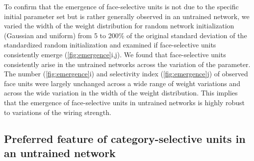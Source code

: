 \documentclass[sn-mathphys-num]{sn-jnl}%
\theoremstyle{thmstyleone}%
\theoremstyle{thmstyletwo}%
\theoremstyle{thmstylethree}%
\begin{document}
To confirm that the emergence of face-selective units is not due to the specific initial parameter set but is rather generally observed in an untrained network,
we varied the width of the weight distribution for random network initialization (Gaussian and uniform) from 5 to 200\% of the original standard deviation of the standardized random initialization and examined if face-selective units consistently emerge (\ref{fig:emergence}i,j).
We found that face-selective units consistently arise in the untrained networks across the variation of the parameter.
The number (\ref{fig:emergence}i) and selectivity index (\ref{fig:emergence}j) of observed face units were largely unchanged across a wide range of weight variations and across the wide variation in the width of the weight distribution.
This implies that the emergence of face-selective units in untrained networks is highly robust to variations of the wiring strength.

\subsection{Preferred feature of category-selective units in an untrained network} \label{sec:preferred}
\end{document}
